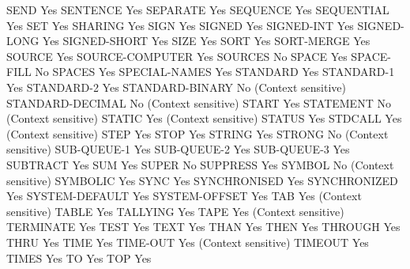 SEND                            Yes
SENTENCE                        Yes
SEPARATE                        Yes
SEQUENCE                        Yes
SEQUENTIAL                      Yes
SET                             Yes
SHARING                         Yes
SIGN                            Yes
SIGNED                          Yes
SIGNED-INT                      Yes
SIGNED-LONG                     Yes
SIGNED-SHORT                    Yes
SIZE                            Yes
SORT                            Yes
SORT-MERGE                      Yes
SOURCE                          Yes
SOURCE-COMPUTER                 Yes
SOURCES                         No
SPACE                           Yes
SPACE-FILL                      No
SPACES                          Yes
SPECIAL-NAMES                   Yes
STANDARD                        Yes
STANDARD-1                      Yes
STANDARD-2                      Yes
STANDARD-BINARY                 No (Context sensitive)
STANDARD-DECIMAL                No (Context sensitive)
START                           Yes
STATEMENT                       No (Context sensitive)
STATIC                          Yes (Context sensitive)
STATUS                          Yes
STDCALL                         Yes (Context sensitive)
STEP                            Yes
STOP                            Yes
STRING                          Yes
STRONG                          No (Context sensitive)
SUB-QUEUE-1                     Yes
SUB-QUEUE-2                     Yes
SUB-QUEUE-3                     Yes
SUBTRACT                        Yes
SUM                             Yes
SUPER                           No
SUPPRESS                        Yes
SYMBOL                          No (Context sensitive)
SYMBOLIC                        Yes
SYNC                            Yes
SYNCHRONISED                    Yes
SYNCHRONIZED                    Yes
SYSTEM-DEFAULT                  Yes
SYSTEM-OFFSET                   Yes
TAB                             Yes (Context sensitive)
TABLE                           Yes
TALLYING                        Yes
TAPE                            Yes (Context sensitive)
TERMINATE                       Yes
TEST                            Yes
TEXT                            Yes
THAN                            Yes
THEN                            Yes
THROUGH                         Yes
THRU                            Yes
TIME                            Yes
TIME-OUT                        Yes (Context sensitive)
TIMEOUT                         Yes
TIMES                           Yes
TO                              Yes
TOP                             Yes
